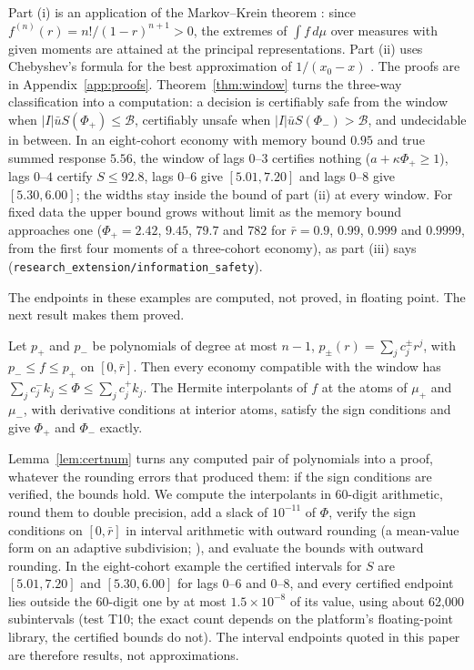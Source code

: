 Part (i) is an application of the Markov--Krein theorem \citep{krein1977,karlin1966}: since $f^{(n)}(r)=n!/(1-r)^{n+1}>0$, the extremes of $\int f\,d\mu$ over measures with given moments are attained at the principal representations. Part (ii) uses Chebyshev's formula for the best approximation of $1/(x_0-x)$ \citep{achieser1956}. The proofs are in Appendix~\ref{app:proofs}. Theorem~\ref{thm:window} turns the three-way classification into a computation: a decision is certifiably safe from the window when $|I|\bar uS(\Phi_+)\le\mathcal B$, certifiably unsafe when $|I|\bar uS(\Phi_-)>\mathcal B$, and undecidable in between. In an eight-cohort economy with memory bound $0.95$ and true summed response $5.56$, the window of lags $0$--$3$ certifies nothing ($a+\kappa\Phi_+\ge1$), lags $0$--$4$ certify $S\le92.8$, lags $0$--$6$ give $[5.01,7.20]$ and lags $0$--$8$ give $[5.30,6.00]$; the widths stay inside the bound of part (ii) at every window. For fixed data the upper bound grows without limit as the memory bound approaches one ($\Phi_+=2.42$, $9.45$, $79.7$ and $782$ for $\bar r=0.9$, $0.99$, $0.999$ and $0.9999$, from the first four moments of a three-cohort economy), as part (iii) says (\texttt{research\_extension/information\_safety}).

The endpoints in these examples are computed, not proved, in floating point. The next result makes them proved.

\begin{lemma}\label{lem:certnum}
Let $p_+$ and $p_-$ be polynomials of degree at most $n-1$, $p_\pm(r)=\sum_jc^\pm_jr^j$, with $p_-\le f\le p_+$ on $[0,\bar r]$. Then every economy compatible with the window has $\sum_jc^-_jk_j\le\Phi\le\sum_jc^+_jk_j$. The Hermite interpolants of $f$ at the atoms of $\mu_+$ and $\mu_-$, with derivative conditions at interior atoms, satisfy the sign conditions and give $\Phi_+$ and $\Phi_-$ exactly.
\end{lemma}

Lemma~\ref{lem:certnum} turns any computed pair of polynomials into a proof, whatever the rounding errors that produced them: if the sign conditions are verified, the bounds hold. We compute the interpolants in 60-digit arithmetic, round them to double precision, add a slack of $10^{-11}$ of $\Phi$, verify the sign conditions on $[0,\bar r]$ in interval arithmetic with outward rounding (a mean-value form on an adaptive subdivision; \citealp{rump2010}), and evaluate the bounds with outward rounding. In the eight-cohort example the certified intervals for $S$ are $[5.01,7.20]$ and $[5.30,6.00]$ for lags $0$--$6$ and $0$--$8$, and every certified endpoint lies outside the 60-digit one by at most $1.5\times10^{-8}$ of its value, using about 62{,}000 subintervals (test T10; the exact count depends on the platform's floating-point library, the certified bounds do not). The interval endpoints quoted in this paper are therefore results, not approximations.

